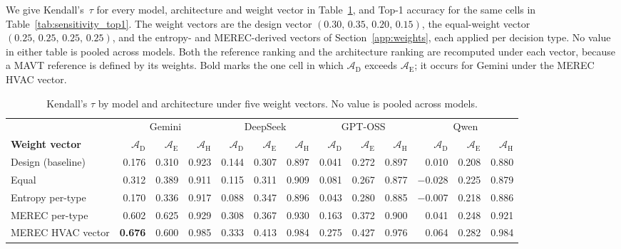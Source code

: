 \documentclass[11pt]{article}
\begin{document}
We give Kendall's~$\tau$ for every model, architecture and weight vector in
Table~\ref{tab:sensitivity_by_model}, and Top-1 accuracy for the same cells in
Table~\ref{tab:sensitivity_top1}. The weight vectors are the design vector
$(0.30,\,0.35,\,0.20,\,0.15)$, the equal-weight vector
$(0.25,\,0.25,\,0.25,\,0.25)$, and the entropy- and MEREC-derived vectors of Section~\ref{app:weights}, each applied per decision type. No
value in either table is pooled across models.
 Both the reference ranking and the architecture ranking are recomputed under each vector, because a MAVT reference is defined by its weights. Bold marks the one cell in which $\mathcal{A}_{\text{D}}$ exceeds $\mathcal{A}_{\text{E}}$; it occurs for Gemini under the MEREC HVAC vector.
\begin{table}[htbp]
\centering
\footnotesize
\centering
\caption{Kendall's $\tau$ by model and architecture under five weight vectors. No value is pooled across models.}
\label{tab:sensitivity_by_model}
\renewcommand{\arraystretch}{1.15}
\setlength{\tabcolsep}{4pt}
\begin{tabular}{@{} l rrr rrr rrr rrr @{}}
\toprule
 & \multicolumn{3}{c}{Gemini} & \multicolumn{3}{c}{DeepSeek} & \multicolumn{3}{c}{GPT-OSS} & \multicolumn{3}{c}{Qwen} \\
\cmidrule(lr){2-4}\cmidrule(lr){5-7}\cmidrule(lr){8-10}\cmidrule(lr){11-13}
\textbf{Weight vector} & $\mathcal{A}_{\text{D}}$ & $\mathcal{A}_{\text{E}}$ & $\mathcal{A}_{\text{H}}$ & $\mathcal{A}_{\text{D}}$ & $\mathcal{A}_{\text{E}}$ & $\mathcal{A}_{\text{H}}$ & $\mathcal{A}_{\text{D}}$ & $\mathcal{A}_{\text{E}}$ & $\mathcal{A}_{\text{H}}$ & $\mathcal{A}_{\text{D}}$ & $\mathcal{A}_{\text{E}}$ & $\mathcal{A}_{\text{H}}$ \\
\midrule
Design (baseline)  & 0.176 & 0.310 & 0.923 & 0.144 & 0.307 & 0.897 & 0.041 & 0.272 & 0.897 & 0.010 & 0.208 & 0.880 \\
Equal              & 0.312 & 0.389 & 0.911 & 0.115 & 0.311 & 0.909 & 0.081 & 0.267 & 0.877 & $-$0.028 & 0.225 & 0.879 \\
\midrule
Entropy per-type   & 0.170 & 0.336 & 0.917 & 0.088 & 0.347 & 0.896 & 0.043 & 0.280 & 0.885 & $-$0.007 & 0.218 & 0.886 \\
\midrule
MEREC per-type     & 0.602 & 0.625 & 0.929 & 0.308 & 0.367 & 0.930 & 0.163 & 0.372 & 0.900 & 0.041 & 0.248 & 0.921 \\
MEREC HVAC vector  & \textbf{0.676} & 0.600 & 0.985 & 0.333 & 0.413 & 0.984 & 0.275 & 0.427 & 0.976 & 0.064 & 0.282 & 0.984 \\
\bottomrule
\end{tabular}
\renewcommand{\arraystretch}{1.0}
\setlength{\tabcolsep}{6pt}
\end{table}
\end{document}
